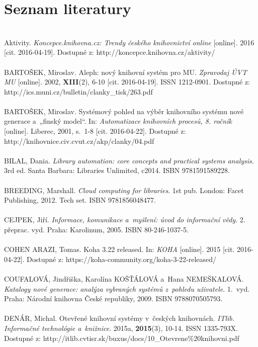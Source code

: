 \documentclass[
	11pt, oneside, printed, final, palatino
	microtype,
	table,   %
	lof,     %
	lot     %
]{fithesis3}
\begin{document}
{\chapter*{Seznam literatury}
~\\
\noindent 
[1] Aktivity. \textit{Koncepce.knihovna.cz: Trendy českého knihovnictví online} [online]. 2016 [cit. 2016-04-19]. Dostupné z: http://koncepce.knihovna.cz/aktivity/
~\\ ~\\ \noindent
[2] BARTOŠEK, Miroslav. Aleph: nový knihovní systém pro MU. \textit{Zpravodaj ÚVT MU} [online]. 2002, 	\textbf{XIII}(2), 6-10 [cit. 2016-04-19]. ISSN 1212-0901. Dostupné z: http://ics.muni.cz/bulletin/clanky\_tisk/263.pdf
~\\ ~\\ \noindent
[3] BARTOŠEK, Miroslav. Systémový pohled na výběr knihovního systému nové generace a~„finský model“. In: \textit{Automatizace knihovních procesů, 8. ročník} [online]. Liberec, 2001, s.~1-8 [cit. 2016-04-22]. Dostupné z: \\http://knihovnice.civ.cvut.cz/akp/clanky/04.pdf
~\\ ~\\ \noindent
[4] BILAL, Dania. \textit{Library automation: core concepts and practical systems analysis}. 3rd ed. Santa Barbara: Libraries Unlimited, c2014. ISBN 9781591589228.
~\\ ~\\ \noindent
[5] BREEDING, Marshall. \textit{Cloud computing for libraries}. 1st pub. London: Facet Publishing, 2012. Tech set. ISBN 9781856048477.
~\\ ~\\ \noindent
[6] CEJPEK, Jiří. \textit{Informace, komunikace a~myšlení: úvod do informační vědy}. 2. přeprac. vyd. Praha: Karolinum, 2005. ISBN 80-246-1037-5.
~\\ ~\\ \noindent
[7] COHEN ARAZI, Tomas. Koha 3.22 released. In: \textit{KOHA} [online]. 2015 [cit. 2016-04-22]. Dostupné z: https://koha-community.org/koha-3-22-released/
~\\ ~\\ \noindent
[8] COUFALOVÁ, Jindřiška, Karolína KOŠŤÁLOVÁ a~Hana NEMEŠKALOVÁ. \textit{Katalogy nové generace: analýza vybraných systémů z~pohledu uživatele}. 1.~vyd. Praha: Národní knihovna České republiky, 2009. ISBN 9788070505793.
~\\ ~\\ \noindent
[9] DENÁR, Michal. Otevřené knihovní systémy v~českých knihovnách. \textit{ITlib. Informačné technológie a~knižnice}. 2015a, 	\textbf{2015}(3), 10-14. ISSN 1335-793X. \\Dostupné  z: http://itlib.cvtisr.sk/buxus/docs/10\_Otevrene\%20knihovni.pdf
}
\end{document}
